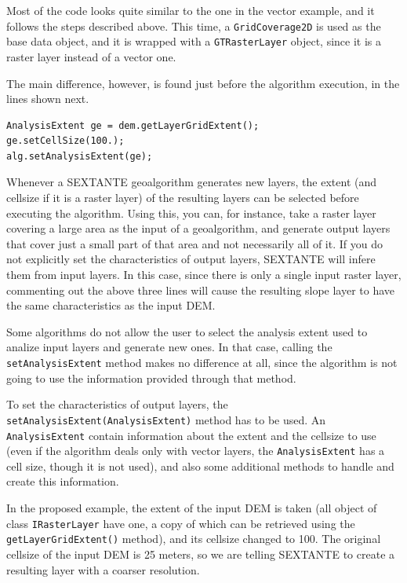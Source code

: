 Most of the code looks quite similar to the one in the vector example, and it follows the steps described above. This time, a \texttt{GridCoverage2D} is used as the base data object, and it is wrapped with a \texttt{GTRasterLayer} object, since it is a raster layer instead of a vector one.

The main difference, however, is found just before the algorithm execution, in the lines shown next.

\begin{verbatim}
AnalysisExtent ge = dem.getLayerGridExtent();
ge.setCellSize(100.);
alg.setAnalysisExtent(ge);
\end{verbatim}

Whenever a SEXTANTE geoalgorithm generates new layers, the extent (and cellsize if it is a raster layer) of the resulting layers can be selected before executing the algorithm. Using this, you can, for instance, take a raster layer covering a large area as the input of a geoalgorithm, and generate output layers that cover just a small part of that area and not necessarily all of it. If you do not explicitly set the characteristics of output layers, SEXTANTE will infere them from input layers. In this case, since there is only a single input raster layer, commenting out the above three lines will cause the resulting slope layer to have the same characteristics as the input DEM.

Some algorithms do not allow the user to select the analysis extent used to analize input layers and generate new ones. In that case, calling the \texttt{setAnalysisExtent} method makes no difference at all, since the algorithm is not going to use the information provided through that method.

To set the characteristics of output layers, the \texttt{setAnalysisExtent(AnalysisExtent)} method has to be used. An \texttt{AnalysisExtent} contain information about the extent and the cellsize to use (even if the algorithm deals only with vector layers, the \texttt{AnalysisExtent} has a cell size, though it is not used), and also some additional methods to handle and create this information.

In the proposed example, the extent of the input DEM is taken (all object of class \texttt{IRasterLayer} have one, a copy of which can be retrieved using the \texttt{getLayerGridExtent()} method), and its cellsize changed to 100. The original cellsize of the input DEM is 25 meters, so we are telling SEXTANTE to create a resulting layer with a coarser resolution.

